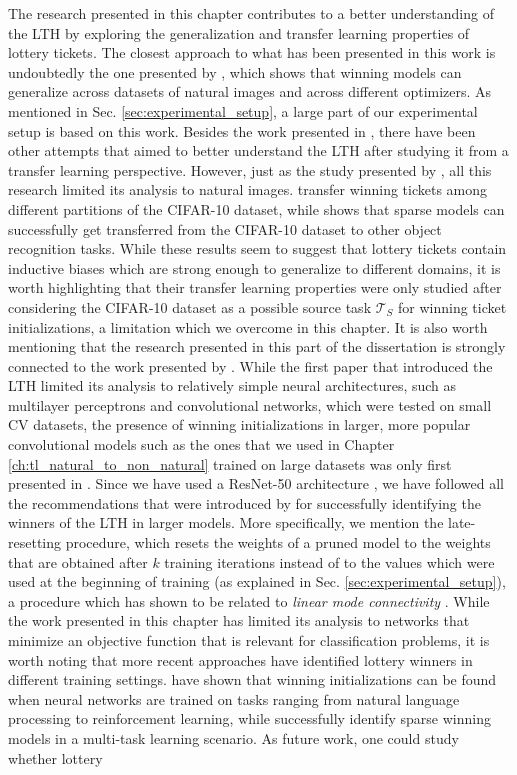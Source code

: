 The research presented in this chapter contributes to a better understanding of the LTH by exploring the generalization and transfer learning properties of lottery tickets. The closest approach to what has been presented in this work is undoubtedly the one presented by \citet{morcos2019one}, which shows that winning models can generalize across datasets of natural images and across different optimizers. As mentioned in Sec. \ref{sec:experimental_setup}, a large part of our experimental setup is based on this work. Besides the work presented in \cite{morcos2019one}, there have been other attempts that aimed to better understand the LTH after studying it from a transfer learning perspective. However, just as the study presented by \citet{morcos2019one}, all this research limited its analysis to natural images. \citet{van2019using} transfer winning tickets among different partitions of the CIFAR-10 dataset, while \citet{mehta2019sparse} shows that sparse models can successfully get transferred from the CIFAR-10 dataset to other object recognition tasks. While these results seem to suggest that lottery tickets contain inductive biases which are strong enough to generalize to different domains, it is worth highlighting that their transfer learning properties were only studied after considering the CIFAR-10 dataset as a possible source task $\mathcal{T}_S$ for winning ticket initializations, a limitation which we overcome in this chapter. It is also worth mentioning that the research presented in this part of the dissertation is strongly connected to the work presented by \citet{franklestabilizing}. While the first paper that introduced the LTH limited its analysis to relatively simple neural architectures, such as multilayer perceptrons and convolutional networks, which were tested on small CV datasets, the presence of winning initializations in larger, more popular convolutional models such as the ones that we used in Chapter \ref{ch:tl_natural_to_non_natural} trained on large datasets \cite{russakovsky2015imagenet} was only first presented in \cite{franklestabilizing}. Since we have used a ResNet-50 architecture \cite{he2016deep}, we have followed all the recommendations that were introduced by \citet{franklestabilizing} for successfully identifying the winners of the LTH in larger models. More specifically, we mention the late-resetting procedure, which resets the weights of a pruned model to the weights that are obtained after $k$ training iterations instead of to the values which were used at the beginning of training (as explained in Sec. \ref{sec:experimental_setup}), a procedure which has shown to be related to \textit{linear mode connectivity} \cite{frankle2019linear}. While the work presented in this chapter has limited its analysis to networks that minimize an objective function that is relevant for classification problems, it is worth noting that more recent approaches have identified lottery winners in different training settings. \citet{yu2019playing} have shown that winning initializations can be found when neural networks are trained on tasks ranging from natural language processing to reinforcement learning, while \citet{sun2019learning} successfully identify sparse winning models in a multi-task learning scenario. As future work, one could study whether lottery 